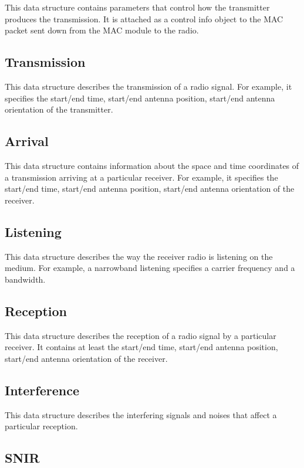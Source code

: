 This data structure contains parameters that control how the transmitter
produces the transmission. It is attached as a control info object to the MAC
packet sent down from the MAC module to the radio.

\subsection{Transmission}

This data structure describes the transmission of a radio signal. For example,
it specifies the start/end time, start/end antenna position, start/end antenna
orientation of the transmitter.

\subsection{Arrival}

This data structure contains information about the space and time coordinates of
a transmission arriving at a particular receiver. For example, it specifies the 
start/end time, start/end antenna position, start/end antenna orientation of the
receiver. 

\subsection{Listening}

This data structure describes the way the receiver radio is listening on the
medium. For example, a narrowband listening specifies a carrier frequency and a
bandwidth.

\subsection{Reception}

This data structure describes the reception of a radio signal by a particular
receiver. It contains at least the start/end time, start/end antenna position,
start/end antenna orientation of the receiver.

\subsection{Interference}

This data structure describes the interfering signals and noises that affect a
particular reception.

\subsection{SNIR}

